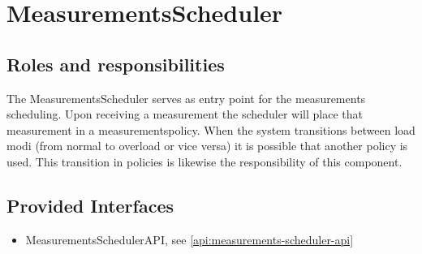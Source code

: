 \section{MeasurementsScheduler}
\label{element:measurements-scheduler}

\subsection{Roles and responsibilities}

\npar The MeasurementsScheduler serves as entry point for the measurements
scheduling. Upon receiving a measurement the scheduler will place that
measurement in a measurementspolicy. When the system transitions between load
modi (from normal to overload or vice versa) it is possible that another policy
is used. This transition in policies is likewise the responsibility of this
component.

\subsection{Provided Interfaces}

\begin{itemize}
    \item MeasurementsSchedulerAPI, see \ref{api:measurements-scheduler-api}
\end{itemize}